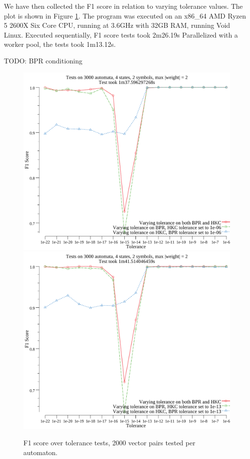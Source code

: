 We have then collected 
the F1 score in relation to varying tolerance values.
The plot is shown in Figure \ref{fig:f1}.  
The program was executed on an x86\_64 AMD Ryzen 5 2600X Six Core CPU, running at 3.6GHz with 32GB RAM, 
running Void Linux. Executed sequentially, F1 score tests took 2m26.19s
Parallelized with a worker pool, the tests took 1m13.12s.

TODO: BPR conditioning

\begin{figure}[htbp!]
    \centering
    \includegraphics[width=.75\textwidth]{./plots/f1-tol-1e-06.pdf}
    \includegraphics[width=.75\textwidth]{./plots/f1-tol-1e-13.pdf}
    \caption{F1 score over tolerance tests, 2000 vector pairs tested per automaton.}
    \label{fig:f1}
\end{figure}

